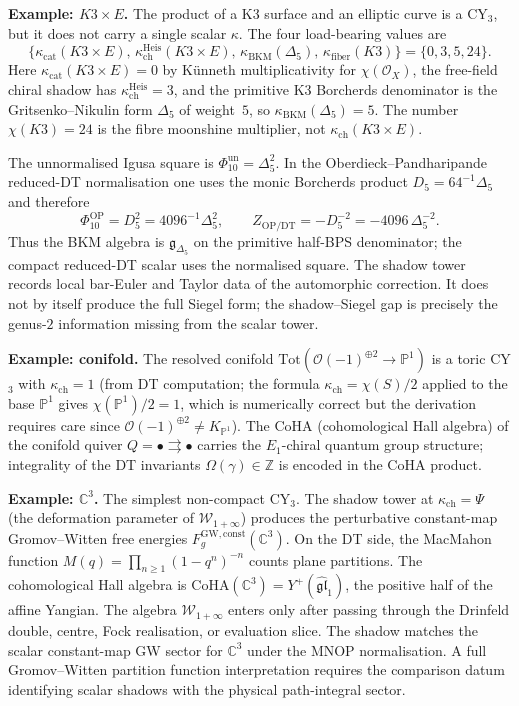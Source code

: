 \documentclass[11pt,reqno]{amsart}
\theoremstyle{definition}
\theoremstyle{remark}
\providecommand{\cO}{\mathcal{O}}
\providecommand{\cW}{\mathcal{W}}
\providecommand{\fg}{\mathfrak{g}}
\providecommand{\fgl}{\mathfrak{gl}}
\providecommand{\bC}{\mathbb{C}}
\providecommand{\bP}{\mathbb{P}}
\providecommand{\bZ}{\mathbb{Z}}
\providecommand{\ch}{\mathrm{ch}}
\numberwithin{equation}{section}
\begin{document}
\medskip\noindent\textbf{Example: $K3 \times E$.}\enspace
The product of a K3 surface and an elliptic curve is a CY$_3$,
but it does not carry a single scalar $\kappa$. The four
load-bearing values are
\[
\bigl\{
\kappa_{\mathrm{cat}}(K3\times E),\,
\kappa_{\ch}^{\mathrm{Heis}}(K3\times E),\,
\kappa_{\mathrm{BKM}}(\Delta_5),\,
\kappa_{\mathrm{fiber}}(K3)
\bigr\}
=\{0,3,5,24\}.
\]
Here $\kappa_{\mathrm{cat}}(K3\times E)=0$ by K\"unneth
multiplicativity for $\chi(\cO_X)$, the free-field chiral shadow
has $\kappa_{\ch}^{\mathrm{Heis}}=3$, and the primitive K3
Borcherds denominator is the Gritsenko--Nikulin form
$\Delta_5$ of weight~$5$, so
$\kappa_{\mathrm{BKM}}(\Delta_5)=5$. The number
$\chi(K3)=24$ is the fibre moonshine multiplier, not
$\kappa_{\ch}(K3\times E)$.

The unnormalised Igusa square is
$\Phi_{10}^{\mathrm{un}}=\Delta_5^2$. In the
Oberdieck--Pandharipande reduced-DT normalisation one uses the
monic Borcherds product
$D_5=64^{-1}\Delta_5$ and therefore
\[
\Phi_{10}^{\mathrm{OP}}=D_5^2=4096^{-1}\Delta_5^2,\qquad
Z_{\mathrm{OP/DT}}=-D_5^{-2}=-4096\,\Delta_5^{-2}.
\]
Thus the BKM algebra is $\fg_{\Delta_5}$ on the primitive
half-BPS denominator; the compact reduced-DT scalar uses the
normalised square. The shadow tower records local bar-Euler and
Taylor data of the automorphic correction. It does not by itself
produce the full Siegel form; the shadow--Siegel gap is precisely
the genus-$2$ information missing from the scalar tower.

\medskip\noindent\textbf{Example: conifold.}\enspace
The resolved conifold $\mathrm{Tot}(\cO(-1)^{\oplus 2} \to
\bP^1)$ is a toric CY$_3$ with $\kappa_{\ch} = 1$ (from
DT computation; the formula $\kappa_{\ch} = \chi(S)/2$ applied
to the base $\bP^1$ gives $\chi(\bP^1)/2 = 1$, which is
numerically correct but the derivation requires care since
$\cO(-1)^{\oplus 2} \neq K_{\bP^1}$). The CoHA
(cohomological Hall algebra) of the conifold quiver
$Q = \bullet \rightrightarrows \bullet$ carries the $E_1$-chiral
quantum group structure; integrality of the DT invariants
$\Omega(\gamma) \in \bZ$ is encoded in the CoHA product.

\medskip\noindent\textbf{Example: $\bC^3$.}\enspace
The simplest non-compact CY$_3$. The shadow tower at
$\kappa_{\ch} = \Psi$ (the deformation parameter of
$\cW_{1+\infty}$) produces the perturbative constant-map
Gromov--Witten free energies $F_g^{\mathrm{GW,const}}(\bC^3)$.
On the DT side, the MacMahon function
$M(q) = \prod_{n \ge 1}(1 - q^n)^{-n}$ counts plane partitions.
The cohomological Hall algebra is
$\mathrm{CoHA}(\bC^3)=Y^+(\widehat{\fgl}_1)$, the positive half
of the affine Yangian. The algebra $\cW_{1+\infty}$ enters only
after passing through the Drinfeld double, centre, Fock
realisation, or evaluation slice.
The shadow matches the scalar constant-map GW sector for $\bC^3$ under
the MNOP normalisation. A full Gromov--Witten partition function
interpretation requires the comparison datum identifying scalar shadows
with the physical path-integral sector.
\end{document}
